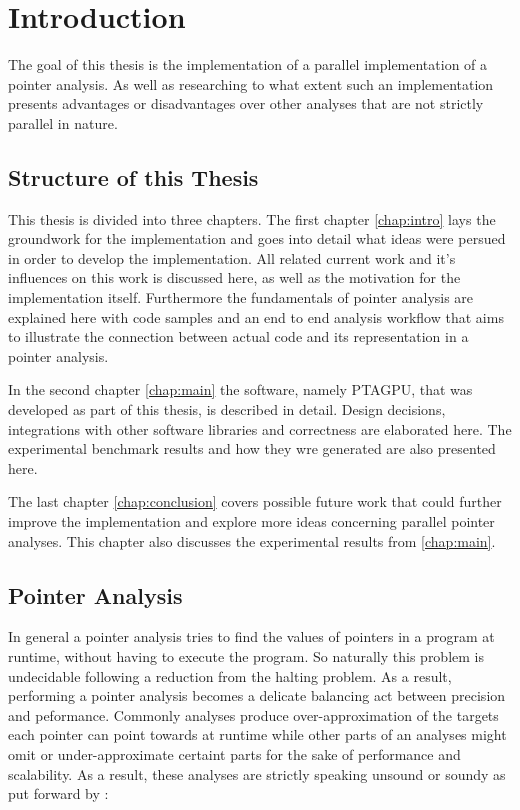 \chapter{Introduction} \label{chap:intro}
The goal of this thesis is the implementation of a parallel implementation of a pointer analysis. As well as researching to what extent such an implementation presents advantages or disadvantages over other analyses that are not strictly parallel in nature.

\section{Structure of this Thesis}
This thesis is divided into three chapters.
The first chapter \autoref{chap:intro} lays the groundwork for the implementation and goes into detail what ideas were persued in order to develop the implementation. All related current work and it's influences on this work is discussed here, as well as the motivation for the implementation itself. Furthermore the fundamentals of pointer analysis are explained here with code samples and an end to end analysis workflow that aims to illustrate the connection between actual code and its representation in a pointer analysis.

In the second chapter \autoref{chap:main} the software, namely PTAGPU, that was developed as part of this thesis, is described in detail. Design decisions, integrations with other software libraries and correctness are elaborated here.
The experimental benchmark results and how they wre generated are also presented here.

The last chapter \autoref{chap:conclusion} covers possible future work that could further improve the implementation and explore more ideas concerning parallel pointer analyses.
This chapter also discusses the experimental results from \autoref{chap:main}.


\section{Pointer Analysis}
In general a pointer analysis tries to find the values of pointers in a program at runtime, without having to execute the program.
So naturally this problem is undecidable \cite{landi1992undecidability} following a reduction from the halting problem.
As a result, performing a pointer analysis becomes a delicate balancing act between precision and peformance.
Commonly analyses produce over-approximation of the targets each pointer can point towards at runtime while other parts of an analyses might omit or under-approximate certaint parts for the sake of performance and scalability.
As a result, these analyses are strictly speaking unsound or soundy as put forward by \cite{livshits2015defense}:

